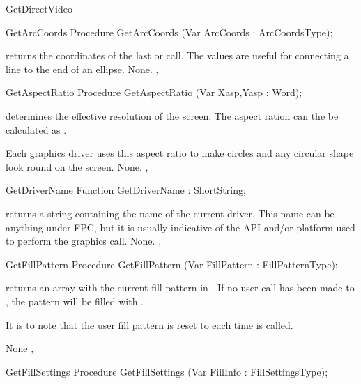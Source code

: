 \begin{function}{GetDirectVideo}
\begin{procedure}{GetArcCoords}
\Declaration
Procedure GetArcCoords (Var ArcCoords : ArcCoordsType);

\Description
{} returns the coordinates of the last  or
 call. The values are useful for connecting a line to
the end of an ellipse.
\Errors
None.
\SeeAlso
{}, 
\end{procedure}

\begin{procedure}{GetAspectRatio}
\Declaration
Procedure GetAspectRatio (Var Xasp,Yasp : Word);

\Description
{} determines the effective resolution of the screen. The aspect ration can
the be calculated as .

Each graphics driver uses this aspect ratio to make circles and any circular
shape look round on the screen.
\Errors
None.
\SeeAlso
{},
\end{procedure}


\begin{function}{GetDriverName}
\Declaration
Function GetDriverName  : ShortString;

\Description
{} returns a string containing the name of the
current driver. This name can be anything under FPC, but it is
usually indicative of the API and/or platform used to perform the
graphics call.
\Errors
None.
\SeeAlso
{}, 
\end{function}

\begin{procedure}{GetFillPattern}
\Declaration
Procedure GetFillPattern (Var FillPattern : FillPatternType);

\Description
{} returns an array with the current fill pattern in .
If no user call has been made to , the pattern will be
filled with .

It is to note that the user fill pattern is reset to  each time
 is called.

\Errors
None
\SeeAlso
{}, 
\end{procedure}

\begin{procedure}{GetFillSettings}
\Declaration
Procedure GetFillSettings (Var FillInfo : FillSettingsType);


\end{procedure}
\end{function}
